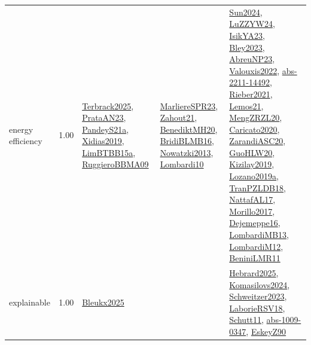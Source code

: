 {\begin{longtable}{p{3cm}r>{\raggedright\arraybackslash}p{6cm}>{\raggedright\arraybackslash}p{6cm}>{\raggedright\arraybackslash}p{8cm}}
\index{energy efficiency}\index{Concepts!energy efficiency}energy efficiency &  1.00 & \hyperref[detail:Terbrack2025]{Terbrack2025}, \hyperref[detail:PrataAN23]{PrataAN23}, \hyperref[detail:PandeyS21a]{PandeyS21a}, \hyperref[detail:Xidias2019]{Xidias2019}, \hyperref[detail:LimBTBB15a]{LimBTBB15a}, \hyperref[detail:RuggieroBBMA09]{RuggieroBBMA09} & \hyperref[detail:MarliereSPR23]{MarliereSPR23}, \hyperref[detail:Zahout21]{Zahout21}, \hyperref[detail:BenediktMH20]{BenediktMH20}, \hyperref[detail:BridiBLMB16]{BridiBLMB16}, \hyperref[detail:Nowatzki2013]{Nowatzki2013}, \hyperref[detail:Lombardi10]{Lombardi10} & \hyperref[detail:Sun2024]{Sun2024}, \hyperref[detail:LuZZYW24]{LuZZYW24}, \hyperref[detail:IsikYA23]{IsikYA23}, \hyperref[detail:Bley2023]{Bley2023}, \hyperref[detail:AbreuNP23]{AbreuNP23}, \hyperref[detail:Valouxis2022]{Valouxis2022}, \hyperref[detail:abs-2211-14492]{abs-2211-14492}, \hyperref[detail:Rieber2021]{Rieber2021}, \hyperref[detail:Lemos21]{Lemos21}, \hyperref[detail:MengZRZL20]{MengZRZL20}, \hyperref[detail:Caricato2020]{Caricato2020}, \hyperref[detail:ZarandiASC20]{ZarandiASC20}, \hyperref[detail:GuoHLW20]{GuoHLW20}, \hyperref[detail:Kizilay2019]{Kizilay2019}, \hyperref[detail:Lozano2019a]{Lozano2019a}, \hyperref[detail:TranPZLDB18]{TranPZLDB18}, \hyperref[detail:NattafAL17]{NattafAL17}, \hyperref[detail:Morillo2017]{Morillo2017}, \hyperref[detail:Dejemeppe16]{Dejemeppe16}, \hyperref[detail:LombardiMB13]{LombardiMB13}, \hyperref[detail:LombardiM12]{LombardiM12}, \hyperref[detail:BeniniLMR11]{BeniniLMR11}\\
\index{explainable}\index{Concepts!explainable}explainable &  1.00 & \hyperref[detail:Bleukx2025]{Bleukx2025} &  & \hyperref[detail:Hebrard2025]{Hebrard2025}, \hyperref[detail:Komasilovs2024]{Komasilovs2024}, \hyperref[detail:Schweitzer2023]{Schweitzer2023}, \hyperref[detail:LaborieRSV18]{LaborieRSV18}, \hyperref[detail:Schutt11]{Schutt11}, \hyperref[detail:abs-1009-0347]{abs-1009-0347}, \hyperref[detail:EskeyZ90]{EskeyZ90}\\

\end{longtable}}
